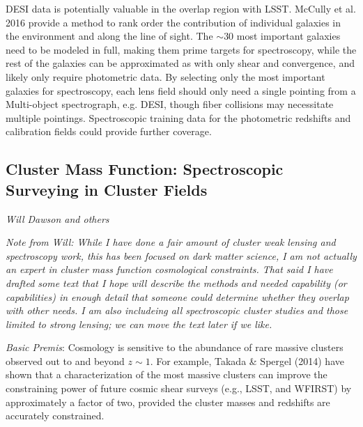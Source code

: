 DESI data is potentially valuable in the overlap region with LSST. McCully et al. 2016 provide a method to rank order the contribution of individual galaxies in the environment and along the line of sight. The $\sim 30$ most important galaxies need to be modeled in full, making them prime targets for spectroscopy, while the rest of the galaxies can be approximated as with only shear and convergence, and likely only require photometric data. By selecting only the most important galaxies for spectroscopy, each lens field should only need a single pointing from a Multi-object spectrograph, e.g. DESI, though fiber collisions may necessitate multiple pointings. Spectroscopic training data for the photometric redshifts and calibration fields could provide further coverage.



\subsection{Cluster Mass Function: Spectroscopic Surveying in Cluster Fields}
\label{sec:sl:clusters}
{\it Will Dawson and others}

{\it Note from Will: While I have done a fair amount of cluster weak lensing and
spectroscopy work, this has been focused on dark matter science, I am not
actually an expert in cluster mass function cosmological constraints. That said
I have drafted some text that I hope will describe the methods and needed
capability (or capabilities) in enough detail that someone could determine
whether they overlap with other needs. I am also includeing all spectroscopic
cluster studies and those limited to strong lensing; we can move the text later
if we like.}

{\it Basic Premis}: Cosmology is sensitive to the abundance of rare massive
clusters observed out to and beyond $z\sim 1$. For example, Takada \& Spergel
(2014) have shown that a characterization of the most massive clusters can
improve the constraining power of future cosmic shear surveys (e.g., LSST, and
WFIRST) by approximately a factor of two, provided the cluster masses and
redshifts are accurately constrained.


